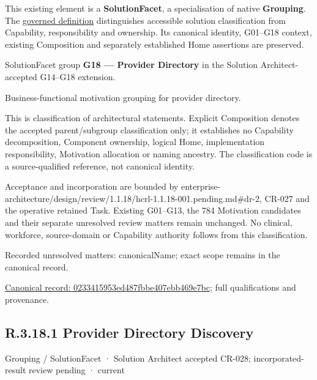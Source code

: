 This existing element is a \textbf{SolutionFacet}, a specialisation of native
\textbf{Grouping}. The \href{\detokenize{../../../../../../../governance/continuum-representation.md#solutionfacet-classification--1119-candidate}}{governed definition}
distinguishes accessible solution classification from Capability, responsibility
and ownership. Its canonical identity, G01–G18 context, existing Composition
and separately established Home assertions are preserved.



SolutionFacet group \textbf{G18 — Provider Directory} in the Solution Architect-accepted G14–G18 extension.



Business-functional motivation grouping for provider directory.



This is classification of architectural statements. Explicit Composition denotes the accepted parent/subgroup classification only; it establishes no Capability decomposition, Component ownership, logical Home, implementation responsibility, Motivation allocation or naming ancestry. The classification code is a source-qualified reference, not canonical identity.



Acceptance and incorporation are bounded by enterprise-architecture/design/review/1.1.18/hcrl-1.1.18-001.pending.md\#dr-2, CR-027 and the operative retained Task. Existing G01–G13, the 784 Motivation candidates and their separate unresolved review matters remain unchanged. No clinical, workforce, source-domain or Capability authority follows from this classification.


{\small Recorded unresolved matters: canonicalName; exact scope remains in the canonical record.}\par
{\footnotesize \href{../../../../../../../continuum/grouping/0233415953ed487fbbe407ebb469e7bc.md}{Canonical record: 0233415953ed487fbbe407ebb469e7bc}; full qualifications and provenance.}\par
\subsection*{R.3.18.1 Provider Directory Discovery}
\label{navigation:R.3.18.1}

\label{element:c445fc55a6e547ae9b1a5bb43cad1a8e}
{\small Grouping / SolutionFacet · Solution Architect accepted CR-028; incorporated-result review pending · current}\par


